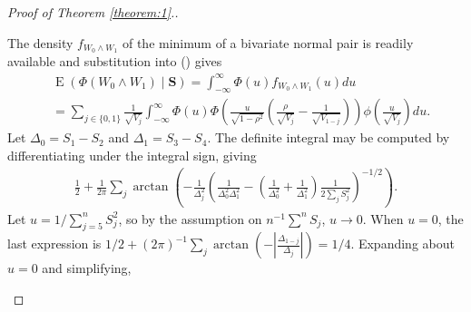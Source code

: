 \documentclass[12pt]{article}
\newcommand{\s}{S}
\newcommand{\w}{W}
\renewcommand{\vec}[1]{\textbf{#1}}
\DeclareMathOperator{\E}{E}
\begin{document}
\begin{proof}[Proof of Theorem \ref{theorem:1}.]
\begin{enumerate}[wide, labelwidth=!, labelindent=0pt]
$$    $$
    The density $f_{\w_0\wedge \w_1}$ of the minimum of a bivariate normal pair is readily available and substitution into () gives
    \begin{align}
      &\E\left(\Phi(\w_0\wedge \w_1)\mid \vec{\s}\right) = \int_{-\infty}^{\infty}\Phi(u)f_{\w_0\wedge \w_1}(u)du\\
      &=\sum_{j\in\{0,1\}}\frac{1}{\sqrt{V_j}}\int_{-\infty}^{\infty}\Phi(u)\Phi\left(\frac{u}{\sqrt{1-\rho^2}}\left(\frac{\rho}{\sqrt{V_j}}-\frac{1}{\sqrt{V_{1-j}}}\right) \right)\phi\left(\frac{u}{\sqrt{V_j}}\right)du.
    \end{align}
    Let $\Delta_0=\s_1-\s_2$ and $\Delta_1=\s_3-\s_4$. The definite integral may be computed by differentiating under the integral sign, giving%
    \begin{align}
      \frac{1}{2}+\frac{1}{2\pi}\sum_j\arctan\left(-\frac{1}{\Delta_j^2}\left(\frac{1}{\Delta_0^2\Delta_1^2}-\left(\frac{1}{\Delta_0^2}+\frac{1}{\Delta_1^2}\right)\frac{1}{2\sum_j\s_j^2}\right)^{-1/2}\right).
    \end{align}
    Let $u=1/\sum_{j=5}^n\s_j^2$, so by the assumption on $n^{-1}\sum^n\s_j$, $u\to 0$. When $u=0$, the last expression is $1/2 + (2\pi)^{-1}\sum_j \arctan\left(-|\frac{\Delta_{1-j}}{\Delta_j}|\right)=1/4$. Expanding about $u=0$ and simplifying, 

\end{enumerate}
\end{proof}
\end{document}
